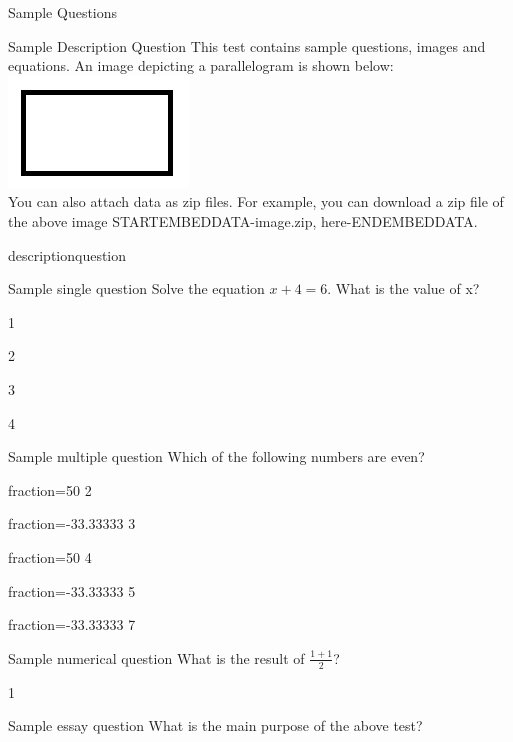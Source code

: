 \documentclass[12pt]{article}
\begin{document}
\begin{quiz}{Sample Questions}

\begin{shortanswer}[default grade=0.0000000, penalty=0.0000000]{Sample Description Question}
This test contains sample questions, images and equations. An image depicting a parallelogram is shown below:\\
\includegraphics{image.png}\\
You can also attach data as zip files. For example, you can download a zip file of the above image STARTEMBEDDATA-image.zip, here-ENDEMBEDDATA.
\\[-1.5cm]\color{white}
\item descriptionquestion
\end{shortanswer}

\begin{multi}{Sample single question}
Solve the equation ${x + 4 = 6}$. What is the value of x?
\item 1
\item* 2
\item 3
\item 4
\end{multi}

\begin{multi}[multiple]{Sample multiple question}
Which of the following numbers are even?
\item[fraction=50] 2
\item[fraction=-33.33333] 3
\item[fraction=50] 4
\item[fraction=-33.33333] 5
\item[fraction=-33.33333] 7
\end{multi}

\begin{numerical}{Sample numerical question}
What is the result of ${\frac{1 + 1}{2}}$?
\item 1
\end{numerical}

\begin{essay}{Sample essay question}
What is the main purpose of the above test?
\end{essay}

\end{quiz}
\end{document}
